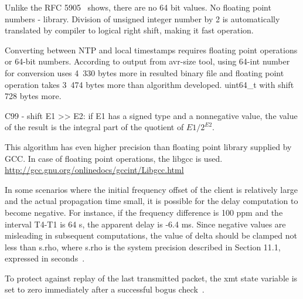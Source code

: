 

Unlike the RFC 5905~\cite{rfc5905} shows, there are no 64 bit values. %
No floating point numbers - library.
Division of unsigned integer number by 2 is automatically translated by compiler to logical right shift,
making it fast operation.

Converting between NTP and local timestamps requires floating point operations or 64-bit numbers.
According to output from avr-size tool, using 64-int number for conversion
uses 4~330 bytes more in %
resulted binary file
and floating point operation takes 3~474 bytes more
than algorithm developed.
uint64\_t with shift 728 bytes more.

C99 - shift E1 >> E2: if E1 has a signed type and a nonnegative value, the value of
the result is the integral part of the quotient of $E1 / 2^{E2}$.

This algorithm has even higher precision than floating point library
supplied by GCC.
In case of floating point operations, the libgcc is used.
\url{http://gcc.gnu.org/onlinedocs/gccint/Libgcc.html}

%
In some scenarios where the initial frequency offset of the client is
  relatively large and the actual propagation time small, it is
   possible for the delay computation to become negative.  For instance,
   if the frequency difference is 100 ppm and the interval T4-T1 is 64
   s, the apparent delay is -6.4 ms.  Since negative values are
   misleading in subsequent computations, the value of delta should be
   clamped not less than s.rho, where s.rho is the system precision
   described in Section 11.1, expressed in seconds~\cite{rfc5905}.
%


To protect against replay of the last transmitted packet,
   the xmt state variable is set to zero immediately after a successful
   bogus check~\cite{rfc5905}.
